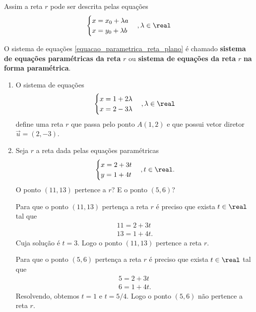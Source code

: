 Assim a reta $r$ pode ser descrita pelas equa\c{c}\~oes
\begin{equation}\label{equacao_parametrica_reta_plano}
  \begin{cases}
    x = x_0 + \lambda a\\
    x = y_0 + \lambda b 
  \end{cases}, \lambda \in \real
\end{equation}

\begin{definicao}
  O sistema de equa\c{c}\~oes \eqref{equacao_parametrica_reta_plano} \'e chamado \textbf{sistema de equa\c{c}\~oes param\'etricas da reta} $r$ ou \textbf{sistema de equa\c{c}\~oes da reta} $r$ \textbf{na forma param\'etrica}.
\end{definicao}

\begin{exemplos}
  \begin{enumerate}
    \item O sistema de equa\c{c}\~oes
    \[
      \begin{cases}
        x = 1 + 2\lambda\\
        x = 2 - 3\lambda
      \end{cases}, \lambda \in \real
    \]
    define uma reta $r$ que passa pelo ponto $A(1,2)$ e que possui vetor diretor $\vec{u} = (2, -3)$.
    \item Seja $r$ a reta dada pelas equa\c{c}\~oes param\'etricas
    \[
      \begin{cases}
        x = 2 + 3t\\
        y = 1 + 4t
      \end{cases}, t\in \real.
    \]
    O ponto $(11, 13)$ pertence a $r$? E o ponto $(5,6)$?
    \begin{solucao}
      Para que o ponto $(11,13)$ perten\c{c}a a reta $r$ \'e preciso que exista $t \in \real$ tal que
      \begin{align*}
        11 = 2 + 3t\\
        13 = 1 + 4t.
      \end{align*}
    Cuja solu\c{c}\~ao \'e $t = 3$. Logo o ponto $(11,13)$ pertence a reta $r$.

    Para que o ponto $(5,6)$ perten\c{c}a a reta $r$ \'e preciso que exista $t \in \real$ tal que
      \begin{align*}
        5 = 2 + 3t\\
        6 = 1 + 4t.
      \end{align*}
    Resolvendo, obtemos $t = 1$ e $t = 5/4$. Logo o ponto $(5,6)$ n\~ao pertence a reta $r$.
    \end{solucao}
  \end{enumerate}
\end{exemplos}

